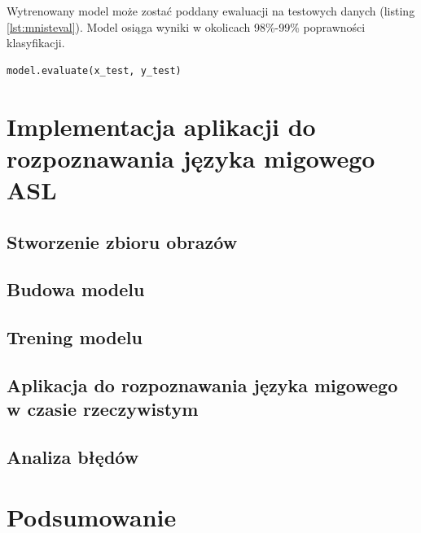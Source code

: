 \documentclass[a4paper,12pt,oneside]{book} %
\begin{document}
Wytrenowany model może zostać poddany ewaluacji na testowych danych (listing \ref{lst:mnisteval}). Model osiąga wyniki w okolicach 98\%-99\% poprawności klasyfikacji\cite{mnistapp}. 

\begin{lstlisting}[language=Python, caption={Ewaluacja modelu\cite{mnistapp}}, label={lst:mnisteval}]
	model.evaluate(x_test, y_test)
\end{lstlisting}


\chapter{Implementacja aplikacji do rozpoznawania języka migowego ASL}
\lipsum[1]

\section{Stworzenie zbioru obrazów}
\lipsum[1]

\section{Budowa modelu}
\lipsum[1]

\section{Trening modelu}
\lipsum[1]

\section{Aplikacja do rozpoznawania języka migowego w czasie rzeczywistym}
\lipsum[1]

\section{Analiza błędów}
\lipsum[1]

\chapter{Podsumowanie}
\lipsum[1]
\lipsum[1]

\listoftables{} %

\listoffigures{} %

\lstlistoflistings
{}



\end{document}
